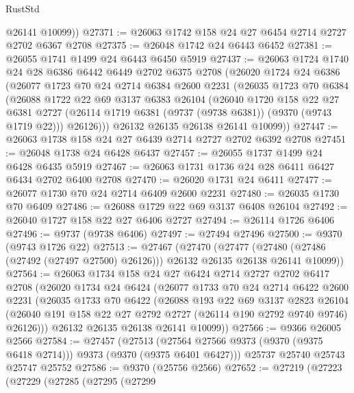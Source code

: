 \begin{lexlean}{RustStd}
\begin{coremodule}
{\begin{coremodule}
{{{{{{{{{{{{{{{{{{{{{{{{{{{{{{{{{{{{{{{        @26141
        @10099))
@27371 := @26063 @1742 @158 @24 @27 @6454 @2714 @2727 @2702 @6367 @2708
@27375 := @26048 @1742 @24 @6443 @6452
@27381 := @26055 @1741 @1499 @24 @6443 @6450 @5919
@27437 := @26063
    @1724
    @1740
    @24
    @28
    @6386
    @6442
    @6449
    @2702
    @6375
    @2708
    (@26020
      @1724
      @24
      @6386
      (@26077
        @1723
        @70
        @24
        @2714
        @6384
        @2600
        @2231
        (@26035
          @1723
          @70
          @6384
          (@26088
            @1722
            @22
            @69
            @3137
            @6383
            @26104
            (@26040
              @1720
              @158
              @22
              @27
              @6381
              @2727
              (@26114 @1719 @6381 (@9737 (@9738 @6381)) (@9370 (@9743 @1719 @22)))
              @26126)))
        @26132
        @26135
        @26138
        @26141
        @10099))
@27447 := @26063 @1738 @158 @24 @27 @6439 @2714 @2727 @2702 @6392 @2708
@27451 := @26048 @1738 @24 @6428 @6437
@27457 := @26055 @1737 @1499 @24 @6428 @6435 @5919
@27467 := @26063 @1731 @1736 @24 @28 @6411 @6427 @6434 @2702 @6400 @2708
@27470 := @26020 @1731 @24 @6411
@27477 := @26077 @1730 @70 @24 @2714 @6409 @2600 @2231
@27480 := @26035 @1730 @70 @6409
@27486 := @26088 @1729 @22 @69 @3137 @6408 @26104
@27492 := @26040 @1727 @158 @22 @27 @6406 @2727
@27494 := @26114 @1726 @6406
@27496 := @9737 (@9738 @6406)
@27497 := @27494 @27496
@27500 := @9370 (@9743 @1726 @22)
@27513 := @27467
    (@27470
      (@27477 (@27480 (@27486 (@27492 (@27497 @27500) @26126))) @26132 @26135 @26138 @26141 @10099))
@27564 := @26063
    @1734
    @158
    @24
    @27
    @6424
    @2714
    @2727
    @2702
    @6417
    @2708
    (@26020
      @1734
      @24
      @6424
      (@26077
        @1733
        @70
        @24
        @2714
        @6422
        @2600
        @2231
        (@26035
          @1733
          @70
          @6422
          (@26088
            @193
            @22
            @69
            @3137
            @2823
            @26104
            (@26040 @191 @158 @22 @27 @2792 @2727 (@26114 @190 @2792 @9740 @9746) @26126)))
        @26132
        @26135
        @26138
        @26141
        @10099))
@27566 := @9366 @26005 @2566
@27584 := @27457
    (@27513 (@27564 @27566 @9373 (@9370 (@9375 @6418 @2714))) @9373 (@9370 (@9375 @6401 @6427)))
    @25737
    @25740
    @25743
    @25747
    @25752
@27586 := @9370 (@25756 @2566)
@27652 := @27219
    (@27223
      (@27229
        (@27285
          (@27295
            (@27299
}}}}}}}}}}}}}}}}}}}}}}}}}}}}}}}}}}}}}}}
\end{coremodule}}
\end{coremodule}
\end{lexlean}
